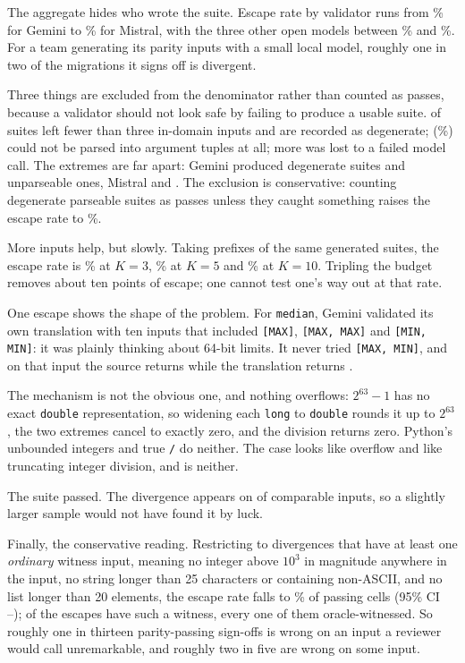 \documentclass[sigconf]{acmart}
\begin{document}
The aggregate hides who wrote the suite. Escape rate by
validator runs from \EscapeGemini\% for Gemini to \EscapeMistral\% for Mistral, with the three
other open models between \EscapeLlama\% and \EscapeDsCoder\%. For a team generating its parity
inputs with a small local model, roughly one in two of the migrations it signs off is divergent.

Three things are excluded from the denominator rather than counted as passes, because a
validator should not look safe by failing to produce a usable suite. \NDegenerate{} of
\NSuites{} suites left fewer than three in-domain inputs and are recorded as degenerate;
\NUnparseable{} (\PctUnparseable\%) could not be parsed into argument tuples at all;
\NCallFailed{} more was lost to a failed model call. The extremes are far apart: Gemini produced \DegenGemini{} degenerate suites and \UnparseGemini{} unparseable
ones, Mistral \DegenMistral{} and \UnparseMistral{}. The exclusion is conservative: counting degenerate parseable suites as passes unless they
caught something raises the escape rate to \EscapeWithDegenerate\%.

More inputs help, but slowly. Taking prefixes of the same generated suites, the escape rate is
\EscapeKThree\% at $K{=}3$, \EscapeKFive\% at $K{=}5$ and \EscapeKTen\% at $K{=}10$. Tripling the
budget removes about ten points of escape; one cannot test one's way out at that rate.

One escape shows the shape of the problem. For \texttt{median},
Gemini validated its own translation with ten inputs that included \texttt{[MAX]},
\texttt{[MAX,\,MAX]} and \texttt{[MIN,\,MIN]}: it was plainly thinking about 64-bit limits. It
never tried \texttt{[MAX,\,MIN]}, and on that input the source returns \texttt{\MedianSrc} while
the translation returns \texttt{\MedianTgt}.

The mechanism is not the obvious one, and nothing overflows: $2^{63}-1$ has no exact
\texttt{double} representation, so widening each \texttt{long} to \texttt{double} rounds it up
to $2^{63}$, the two extremes cancel to exactly zero, and the division returns zero. Python's unbounded integers and true \texttt{/} do neither. The
case looks like overflow and like truncating integer division, and is neither.

The suite passed. The divergence appears on \MedianDiverge{} of \MedianComparable{} comparable
inputs, so a slightly larger sample would not have found it by luck.

Finally, the conservative reading. Restricting to divergences that have at least one
\emph{ordinary} witness input, meaning no integer above $10^3$ in magnitude anywhere in the
input, no string longer than 25 characters or containing non-ASCII, and no list longer than 20
elements, the escape rate falls to \EscapeOrdinary\% of passing cells
(95\% CI \EscapeOrdinaryLo--\EscapeOrdinaryHi); \NEscapedOrdinary{} of the \NEscaped{} escapes have
such a witness, every one of them oracle-witnessed. So roughly one in thirteen parity-passing
sign-offs is wrong on an input a reviewer would call unremarkable, and roughly two in five are
wrong on some input.
\end{document}
